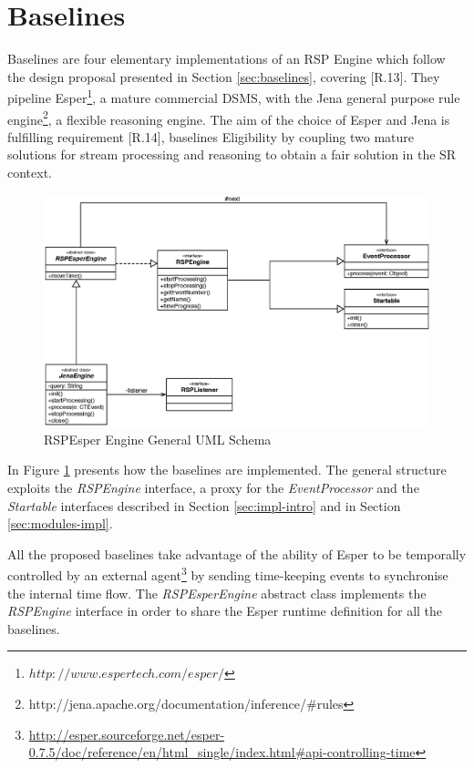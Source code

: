 \section{Baselines}\label{sec:baselines-impl}

\name Baselines are four elementary implementations of an RSP Engine which follow the design proposal presented in Section \ref{sec:baselines}, covering [R.13]. They pipeline Esper\footnote{$http://www.espertech.com/esper/$}, a mature commercial DSMS, with the Jena general purpose rule engine\footnote{http://jena.apache.org/documentation/inference/\#rules
}, a flexible reasoning engine. The aim of the choice of Esper and Jena is fulfilling requirement [R.14], baselines Eligibility by coupling two mature solutions for stream processing and reasoning to obtain a fair solution in the SR context. 

\begin{figure}[tbh]
  \centering
	\includegraphics[width=\linewidth]{images/uml_baselines_general}
	\caption{RSPEsper Engine General UML Schema} 
  	\label{fig:uml_baselines_general}
\end{figure}

In Figure \ref{fig:uml_baselines_general} presents how the baselines are implemented. The general structure exploits the \textit{RSPEngine} interface, a proxy for the \textit{EventProcessor} and the \textit{Startable}  interfaces described in Section \ref{sec:impl-intro} and in Section \ref{sec:modules-impl}. 

All the proposed baselines take advantage of the ability of Esper to be temporally controlled by an external agent\footnote{\url{http://esper.sourceforge.net/esper-0.7.5/doc/reference/en/html_single/index.html#api-controlling-time}} by sending time-keeping events to synchronise the internal time flow. The \textit{RSPEsperEngine} abstract class implements the \textit{RSPEngine} interface in order to share the Esper runtime definition for all the baselines. 

